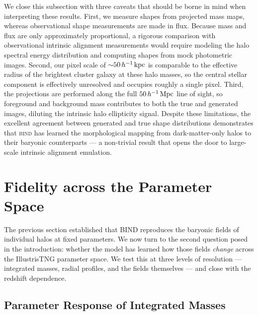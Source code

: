 \documentclass[linenumbers,trackchanges, twocolumn]{aastex701}
\begin{document}
We close this subsection with three caveats that should be borne in mind when interpreting these results. First, we measure shapes from projected mass maps, whereas observational shape measurements are made in flux. Because mass and flux are only approximately proportional, a rigorous comparison with observational intrinsic alignment measurements would require modeling the halo spectral energy distribution and computing shapes from mock photometric images. Second, our pixel scale of ${\sim}50\,h^{-1}\,{\rm kpc}$ is comparable to the effective radius of the brightest cluster galaxy at these halo masses, so the central stellar component is effectively unresolved and occupies roughly a single pixel. Third, the projections are performed along the full $50\,h^{-1}\,{\rm Mpc}$ line of sight, so foreground and background mass contributes to both the true and generated images, diluting the intrinsic halo ellipticity signal. Despite these limitations, the excellent agreement between generated and true shape distributions demonstrates that \textsc{bind} has learned the morphological mapping from dark-matter-only halos to their baryonic counterparts --- a non-trivial result that opens the door to large-scale intrinsic alignment emulation.

\section{Fidelity across the Parameter Space}
\label{sec:param_response}
The previous section established that \textsc{BIND} reproduces the baryonic fields of individual halos at fixed parameters. We now turn to the second question posed in the introduction: whether the model has learned how those fields \emph{change} across the IllustrisTNG parameter space. We test this at three levels of resolution --- integrated masses, radial profiles, and the fields themselves --- and close with the redshift dependence.

\subsection{Parameter Response of Integrated Masses}
\label{subsec:mass_response}
\end{document}
